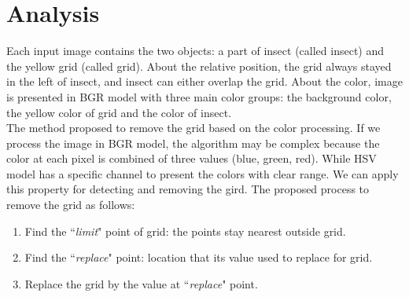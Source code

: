 \section{Analysis}
Each input image contains the two objects: a part of insect (called insect) and the yellow grid (called grid). About the relative position, the grid always stayed in the left of insect, and insect can either overlap the grid. About the color, image is presented in BGR model with three main color groups: the background color, the yellow color of grid and the color of insect.\\[0.2cm]
The method proposed to remove the grid based on the color processing. If we process the image in BGR model, the algorithm may be complex because the color at each pixel is combined of three values (blue, green, red). While HSV model has a specific channel to present the colors with clear range. We can apply this property for detecting and removing the gird. The proposed process to remove  the grid as follows:
\begin{enumerate}
\item Find the ``\textit{limit}" point of grid: the points stay nearest outside grid.
\item Find the ``\textit{replace}" point: location that its value used to replace for grid.
\item Replace the grid by the value at ``\textit{replace}" point.
\end{enumerate}
